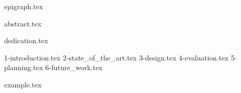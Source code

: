 \documentclass{uc3mthesisIEEE}
\begin{document}

	\maketitle
	\blankpage

	{epigraph.tex}
	\blankpage

	{abstract.tex}
	\blankpage

	{dedication.tex}
	\blankpage

	\tableofcontents
	\thispagestyle{fancy}
	\blankpage

	\listoffigures
	\thispagestyle{fancy}
	\blankpage

	\listoftables
	\thispagestyle{fancy}
	\blankpage


	\clearpage

	{1-introduction.tex}
	{2-state_of_the_art.tex}
	{3-design.tex}
	{4-evaluation.tex}
	{5-planning.tex}
	{6-future_work.tex}

  \newpage
	{example.tex}



	\clearpage

	\printbibliography




\end{document}
